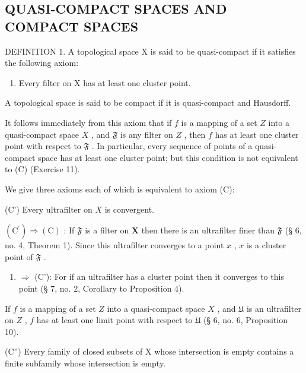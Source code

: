 \subsection{QUASI-COMPACT SPACES AND COMPACT SPACES}

DEFINITION 1. A topological space X is said to be quasi-compact if it satisfies the following axiom:

\begin{enumerate}
\def\labelenumi{(\Alph{enumi})}
\setcounter{enumi}{2}
\tightlist
\item
  Every filter on X has at least one cluster point.
\end{enumerate}

A topological space is said to be compact if it is quasi-compact and Hausdorff.

It follows immediately from this axiom that if \(f\) is a mapping of a set \(Z\) into a quasi-compact space \(X\) , and \(\mathfrak{F}\) is any filter on \(Z\) , then \(f\) has at least one cluster point with respect to \(\mathfrak{F}\) . In particular, every sequence of points of a quasi-compact space has at least one cluster point; but this condition is not equivalent to (C) (Exercise 11).

We give three axioms each of which is equivalent to axiom (C):

(C') Every ultrafilter on \(X\) is convergent.

\((\mathrm{C}^{\prime}) \Longrightarrow (\mathrm{C})\) : If \(\mathfrak{F}\) is a filter on \(\mathbf{X}\) then there is an ultrafilter finer than \(\mathfrak{F}\) (§ 6, no. 4, Theorem 1). Since this ultrafilter converges to a point \(x\) , \(x\) is a cluster point of \(\mathfrak{F}\) .

\begin{enumerate}
\def\labelenumi{(\Alph{enumi})}
\setcounter{enumi}{2}
\tightlist
\item
  \(\Longrightarrow\) (C'): For if an ultrafilter has a cluster point then it converges to this point (§ 7, no. 2, Corollary to Proposition 4).
\end{enumerate}

If \(f\) is a mapping of a set \(Z\) into a quasi-compact space \(X\) , and \(\mathfrak{U}\) is an ultrafilter on \(Z\) , \(f\) has at least one limit point with respect to \(\mathfrak{U}\) (§ 6, no. 6, Proposition 10).

(C'') Every family of closed subsets of X whose intersection is empty contains a finite subfamily whose intersection is empty.

